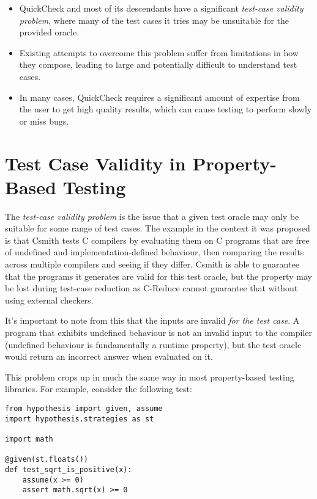 \begin{itemize}
\item QuickCheck and most of its descendants have a significant \emph{test-case validity problem}\cite{DBLP:conf/pldi/RegehrCCEEY12},
where many of the test cases it tries may be unsuitable for the provided oracle.
\item Existing attempts to overcome this problem suffer from limitations in how they compose,
leading to large and potentially difficult to understand test cases. 
\item In many cases,
QuickCheck requires a significant amount of expertise from the user to get high quality results,
which can cause testing to perform slowly or miss bugs.
\end{itemize}

\section{Test Case Validity in Property-Based Testing}\label{sec:validity}

The \emph{test-case validity problem}\cite{DBLP:conf/pldi/RegehrCCEEY12} is the issue that a given test oracle may only be suitable for some range of test cases.
The example in the context it was proposed is that Csmith tests C compilers by evaluating them on C programs that are free of undefined and implementation-defined behaviour,
then comparing the results across multiple compilers and seeing if they differ.
Csmith is able to guarantee that the programs it generates are valid for this test oracle,
but the property may be lost during test-case reduction as C-Reduce cannot guarantee that without using external checkers.

It's important to note from this that the inputs are invalid \emph{for the test case}.
A program that exhibits undefined behaviour is not an invalid input to the compiler (undefined behaviour is fundamentally a runtime property),
but the test oracle would return an incorrect answer when evaluated on it.

This problem crops up in much the same way in most property-based testing libraries.
For example,
consider the following test:

\begin{lstlisting}
from hypothesis import given, assume
import hypothesis.strategies as st

import math

@given(st.floats())
def test_sqrt_is_positive(x):
    assume(x >= 0)
    assert math.sqrt(x) >= 0
\end{lstlisting}

